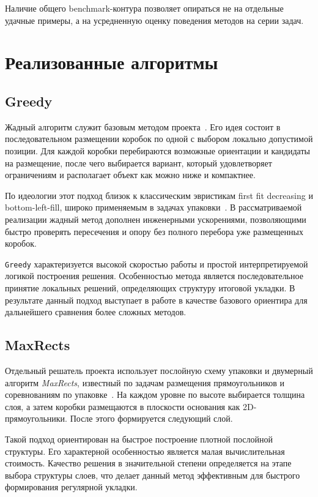 \documentclass[14pt,a4paper]{extarticle}
\begin{document}
Наличие общего benchmark-контура позволяет опираться не на отдельные удачные примеры, а на усредненную оценку поведения методов на серии задач.

\pagebreak

\section{Реализованные алгоритмы}

\subsection{Greedy}

Жадный алгоритм служит базовым методом проекта~\cite{project_repo}. Его идея состоит в последовательном размещении коробок по одной с выбором локально допустимой позиции. Для каждой коробки перебираются возможные ориентации и кандидаты на размещение, после чего выбирается вариант, который удовлетворяет ограничениям и располагает объект как можно ниже и компактнее.

По идеологии этот подход близок к классическим эвристикам first fit decreasing и bottom-left-fill, широко применяемым в задачах упаковки~\cite{wiki_bin_packing}. В рассматриваемой реализации жадный метод дополнен инженерными ускорениями, позволяющими быстро проверять пересечения и опору без полного перебора уже размещенных коробок.

\texttt{Greedy} характеризуется высокой скоростью работы и простой интерпретируемой логикой построения решения. Особенностью метода является последовательное принятие локальных решений, определяющих структуру итоговой укладки. В результате данный подход выступает в работе в качестве базового ориентира для дальнейшего сравнения более сложных методов.

\subsection{MaxRects}

Отдельный решатель проекта использует послойную схему упаковки и двумерный алгоритм \textit{MaxRects}, известный по задачам размещения прямоугольников и соревнованиям по упаковке~\cite{kaggle_sleigh,project_repo}. На каждом уровне по высоте выбирается толщина слоя, а затем коробки размещаются в плоскости основания как 2D-прямоугольники. После этого формируется следующий слой.

Такой подход ориентирован на быстрое построение плотной послойной структуры. Его характерной особенностью является малая вычислительная стоимость. Качество решения в значительной степени определяется на этапе выбора структуры слоев, что делает данный метод эффективным для быстрого формирования регулярной укладки.
\end{document}
